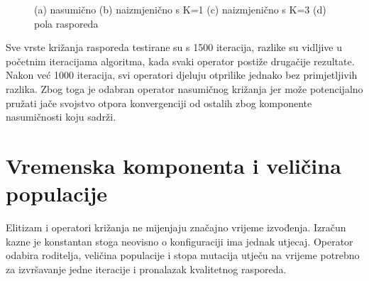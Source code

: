\documentclass[times, utf8, zavrsni]{fer}
\begin{document}
\begin{figure}[htb]
    \centering
    \caption{(a) nasumično (b) naizmjenično s K=1 (c) naizmjenično s K=3 (d) pola rasporeda}
    \label{fig:krizanja}
\end{figure}

Sve vrste križanja rasporeda testirane su s 1500 iteracija, razlike su vidljive u početnim iteracijama algoritma, kada svaki operator postiže drugačije rezultate. Nakon već 1000 iteracija, svi operatori djeluju otprilike jednako bez primjetljivih razlika. Zbog toga je odabran operator nasumičnog križanja jer može potencijalno pružati jače svojstvo otpora konvergenciji od ostalih zbog komponente nasumičnosti koju sadrži.

\section{Vremenska komponenta i veličina populacije}

Elitizam i operatori križanja ne mijenjaju značajno vrijeme izvođenja. Izračun kazne je konstantan stoga neovisno o konfiguraciji ima jednak utjecaj. Operator odabira roditelja, veličina populacije i stopa mutacija utječu na vrijeme potrebno za izvršavanje jedne iteracije i pronalazak kvalitetnog rasporeda.
\end{document}
